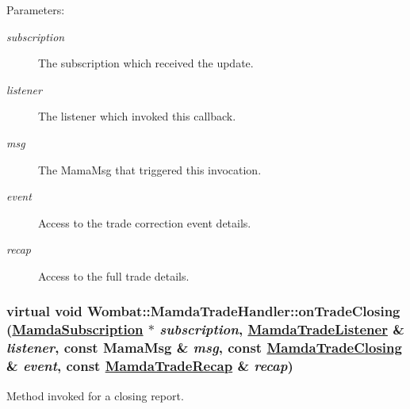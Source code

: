 \begin{Desc}
\item[Parameters:]
\begin{description}
\item[{\em subscription}]The subscription which received the update. \item[{\em listener}]The listener which invoked this callback. \item[{\em msg}]The Mama\-Msg that triggered this invocation. \item[{\em event}]Access to the trade correction event details. \item[{\em recap}]Access to the full trade details. \end{description}
\end{Desc}
\hypertarget{classWombat_1_1MamdaTradeHandler_1e6ee074b064105c2b018c7465617d8c}{
\subsubsection[onTradeClosing]{\setlength{\rightskip}{0pt plus 5cm}virtual void Wombat::Mamda\-Trade\-Handler::on\-Trade\-Closing (\hyperlink{classWombat_1_1MamdaSubscription}{Mamda\-Subscription} $\ast$ {\em subscription}, \hyperlink{classWombat_1_1MamdaTradeListener}{Mamda\-Trade\-Listener} \& {\em listener}, const Mama\-Msg \& {\em msg}, const \hyperlink{classWombat_1_1MamdaTradeClosing}{Mamda\-Trade\-Closing} \& {\em event}, const \hyperlink{classWombat_1_1MamdaTradeRecap}{Mamda\-Trade\-Recap} \& {\em recap})}}
\label{classWombat_1_1MamdaTradeHandler_1e6ee074b064105c2b018c7465617d8c}


Method invoked for a closing report. 

